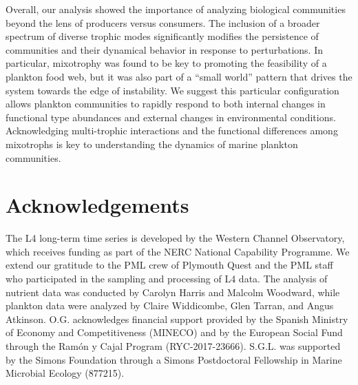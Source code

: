 \documentclass[12pt]{article}
\begin{document}
Overall, our analysis showed the importance of analyzing biological communities beyond the lens of producers versus consumers. The inclusion of a broader spectrum of diverse trophic modes significantly modifies the persistence of communities and their dynamical behavior in response to perturbations. In particular, mixotrophy was found to be key to promoting the feasibility of a plankton food web, but it was also part of a ``small world'' pattern that drives the system towards the edge of instability. We suggest this particular configuration allows plankton communities to rapidly respond to both internal changes in functional type abundances and external changes in environmental conditions. Acknowledging multi-trophic interactions and the functional differences among mixotrophs is key to understanding the dynamics of marine plankton communities. 

\section*{Acknowledgements}

The L4 long-term time series is developed by the Western Channel Observatory, which receives funding as part of the NERC National Capability Programme. We extend our gratitude to the PML crew of Plymouth Quest and the PML staff who participated in the sampling and processing of L4 data. The analysis of nutrient data was conducted by Carolyn Harris and Malcolm Woodward, while plankton data were analyzed by Claire Widdicombe, Glen Tarran, and Angus Atkinson. O.G. acknowledges financial support provided by the Spanish Ministry of Economy and Competitiveness (MINECO) and by the European Social Fund through the Ram\'{o}n y Cajal Program (RYC-2017-23666). S.G.L. was supported by the Simons Foundation through a Simons Postdoctoral Fellowship in Marine Microbial Ecology (877215).



\end{document}
